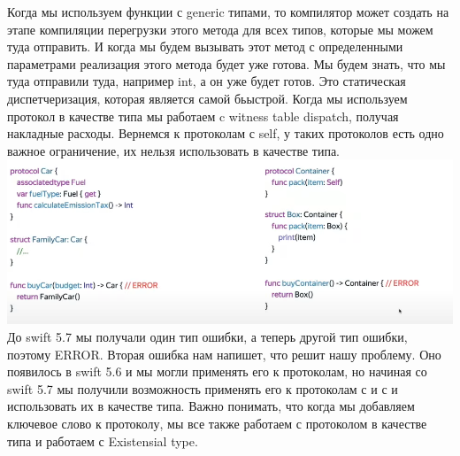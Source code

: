 \documentclass{article}
\begin{document}
    \newline
    Когда мы используем функции с generic типами, то компилятор может создать на этапе компиляции перегрузки этого метода для всех типов, которые мы можем туда отправить. И когда мы будем вызывать этот метод с определенными параметрами реализация этого метода будет уже готова. Мы будем знать, что мы туда отправили туда, например int, а он уже будет готов. Это статическая диспетчеризация, которая является самой бьыстрой. 
    \newline
    Когда мы используем протокол в качестве типа мы работаем c witness table dispatch, получая накладные расходы. 
    \newline
    Вернемся к протоколам с self, у таких протоколов есть одно важное ограничение, их нельзя использовать в качестве типа. 
    \newline
    \includegraphics[scale = 0.5]{pic/Снимок экрана 2023-07-28 в 22.59.11.png}
    \newline
    До swift 5.7 мы получали один тип ошибки, а теперь другой тип ошибки, поэтому ERROR.
    \newline
    Вторая ошибка нам напишет, что  решит нашу проблему. Оно появилось в swift 5.6 и мы могли применять его к протоколам, но начиная со swift 5.7 мы получили возможность применять его к протоколам с  и с  и использовать их в качестве типа. 
    \newline
    Важно понимать, что когда мы добавляем ключевое слово  к протоколу, мы все также работаем с протоколом в качестве типа и работаем с Existensial type.
    \newline
\end{document}
